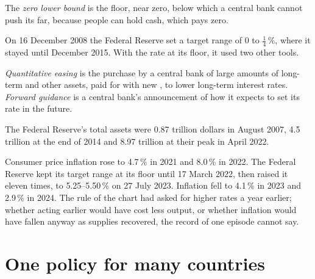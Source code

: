 \begin{definition}\label{def:g12:monetary-policy:zlb}
The \emph{zero lower bound} is the floor, near zero, below which a central bank cannot push its  far, because people can hold cash, which
pays zero.
\end{definition}

On 16 December 2008 the Federal Reserve set a target range of 0 to $\tfrac14\,\%$, where it stayed until December 2015. With the rate at its floor, it used two other tools.

\begin{definition}\label{def:g12:monetary-policy:qe}
\emph{Quantitative easing} is the purchase by a central bank of large amounts of long-term  and other assets, paid for with new , to lower long-term interest rates. \emph{Forward guidance}\label{def:g12:monetary-policy:forward-guidance} is a central bank's
announcement of how it expects to set its rate in the future.
\end{definition}

The Federal Reserve's total assets were 0.87 trillion dollars in August 2007, 4.5 trillion at the end of 2014 and 8.97 trillion at their peak in April 2022.

\begin{record}[2021--23]
Consumer price inflation rose to 4.7\,\% in 2021 and 8.0\,\% in 2022. The Federal Reserve kept its target range at its floor until 17 March 2022, then raised it eleven
times, to 5.25--5.50\,\% on 27 July 2023. Inflation fell to 4.1\,\% in 2023 and 2.9\,\% in 2024. The rule of the chart had asked for higher rates a year earlier; whether
acting earlier would have cost less output, or whether inflation would have fallen anyway as supplies recovered, the record of one episode cannot say.
\end{record}

\section{One policy for many countries}\label{sec:g12:monetary-policy:union}

